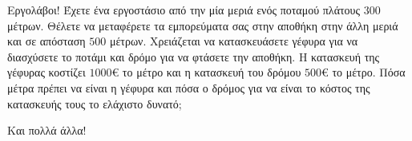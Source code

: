 \documentclass{../presentation}
\begin{document}
\begin{askisi}{Εργολάβοι!}
  Έχετε ένα εργοστάσιο από την μία μεριά ενός ποταμού πλάτους $300$ μέτρων. Θέλετε να μεταφέρετε τα εμπορεύματα σας στην αποθήκη στην άλλη μεριά και σε απόσταση $500$ μέτρων. Χρειάζεται να κατασκευάσετε γέφυρα για να διασχύσετε το ποτάμι και δρόμο για να φτάσετε την αποθήκη. Η κατασκευή της γέφυρας κοστίζει $1000\euro$ το μέτρο και η κατασκευή του δρόμου $500\euro$ το μέτρο. Πόσα μέτρα πρέπει να είναι η γέφυρα και πόσα ο δρόμος για να είναι το κόστος της κατασκευής τους το ελάχιστο δυνατό;
\end{askisi}

\begin{frame}{Και πολλά άλλα!}

\end{frame}
\end{document}
